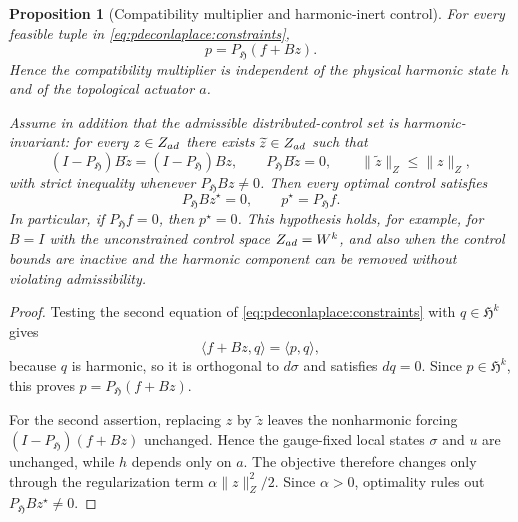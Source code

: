 \documentclass[10pt,a4paper]{amsart}
\newtheorem{proposition}{Proposition}
\newcommand{\HH}{\mathfrak H}
\newcommand{\ip}[2]{\langle #1,#2\rangle}
\newcommand{\norm}[1]{\lVert #1\rVert}
\begin{document}
\begin{proposition}[Compatibility multiplier and harmonic-inert control]
\label{prop:p-inert}
For every feasible tuple in \eqref{eq:pdeconlaplace:constraints},
\[
 p=P_{\HH}(f+Bz).
\]
Hence the compatibility multiplier is independent of the physical harmonic state
$h$ and of the topological actuator $a$.

Assume in addition that the admissible distributed-control set is
\emph{harmonic-invariant}: for every $z\in Z_{\rm ad}$ there exists
$\widetilde z\in Z_{\rm ad}$ such that
\[
 (I-P_{\HH})B\widetilde z=(I-P_{\HH})Bz,\qquad
 P_{\HH}B\widetilde z=0,\qquad
 \norm{\widetilde z}_{Z}\le \norm{z}_{Z},
\]
with strict inequality whenever $P_{\HH}Bz\neq0$. Then every optimal control
satisfies
\[
 P_{\HH}Bz^{\star}=0,\qquad p^{\star}=P_{\HH}f.
\]
In particular, if $P_{\HH}f=0$, then $p^{\star}=0$. This hypothesis holds, for
example, for $B=I$ with the unconstrained control space
$Z_{\rm ad}=W^{k}$, and also when the control bounds are inactive and the
harmonic component can be removed without violating admissibility.
\end{proposition}

\begin{proof}
Testing the second equation of \eqref{eq:pdeconlaplace:constraints} with
$q\in\HH^{k}$ gives
\[
 \ip{f+Bz}{q}=\ip{p}{q},
\]
because $q$ is harmonic, so it is orthogonal to $d\sigma$ and satisfies
$dq=0$. Since $p\in\HH^{k}$, this proves
$p=P_{\HH}(f+Bz)$.

For the second assertion, replacing $z$ by $\widetilde z$ leaves the
nonharmonic forcing $(I-P_{\HH})(f+Bz)$ unchanged. Hence the gauge-fixed local
states $\sigma$ and $u$ are unchanged, while $h$ depends only on $a$. The
objective therefore changes only through the regularization term
$\alpha\norm{z}_{Z}^{2}/2$. Since $\alpha>0$, optimality rules out
$P_{\HH}Bz^{\star}\neq0$.
\end{proof}
\end{document}
